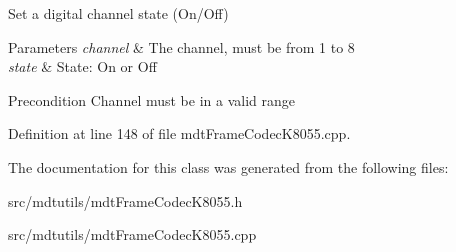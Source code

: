 Set a digital channel state (On/Off) 


\begin{DoxyParams}{Parameters}
{\em channel} & The channel, must be from 1 to 8 \\
\hline
{\em state} & State: On or Off \\
\hline
\end{DoxyParams}
\begin{DoxyPrecond}{Precondition}
Channel must be in a valid range 
\end{DoxyPrecond}


Definition at line 148 of file mdtFrameCodecK8055.cpp.



The documentation for this class was generated from the following files:\begin{DoxyCompactItemize}
\item 
src/mdtutils/mdtFrameCodecK8055.h\item 
src/mdtutils/mdtFrameCodecK8055.cpp\end{DoxyCompactItemize}
